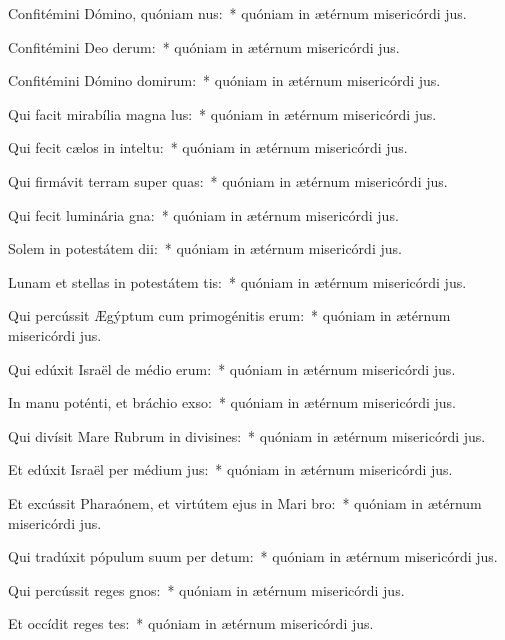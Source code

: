 \item Confitémini Dómino, quóniam nus:~* quóniam in ætérnum misericórdi jus.
\item Confitémini Deo derum:~* quóniam in ætérnum misericórdi jus.
\item Confitémini Dómino domirum:~* quóniam in ætérnum misericórdi jus.
\item Qui facit mirabília magna lus:~* quóniam in ætérnum misericórdi jus.
\item Qui fecit cælos in inteltu:~* quóniam in ætérnum misericórdi jus.
\item Qui firmávit terram super quas:~* quóniam in ætérnum misericórdi jus.
\item Qui fecit luminária gna:~* quóniam in ætérnum misericórdi jus.
\item Solem in potestátem dii:~* quóniam in ætérnum misericórdi jus.
\item Lunam et stellas in potestátem tis:~* quóniam in ætérnum misericórdi jus.
\item Qui percússit Ægýptum cum primogénitis erum:~* quóniam in ætérnum misericórdi jus.
\item Qui edúxit Israël de médio erum:~* quóniam in ætérnum misericórdi jus.
\item In manu poténti, et bráchio exso:~* quóniam in ætérnum misericórdi jus.
\item Qui divísit Mare Rubrum in divisines:~* quóniam in ætérnum misericórdi jus.
\item Et edúxit Israël per médium jus:~* quóniam in ætérnum misericórdi jus.
\item Et excússit Pharaónem, et virtútem ejus in Mari bro:~* quóniam in ætérnum misericórdi jus.
\item Qui tradúxit pópulum suum per detum:~* quóniam in ætérnum misericórdi jus.
\item Qui percússit reges gnos:~* quóniam in ætérnum misericórdi jus.
\item Et occídit reges tes:~* quóniam in ætérnum misericórdi jus.
